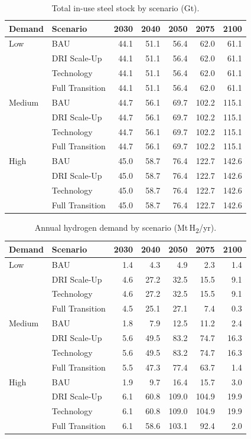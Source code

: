 \begin{table}[h!]
\centering
\small
\caption{Total in-use steel stock by scenario (Gt).}
\label{tab:app_steel_stock}
\begin{tabular}{llrrrrr}
\toprule
Demand & Scenario & 2030 & 2040 & 2050 & 2075 & 2100 \\
\midrule
Low & BAU & 44.1 & 51.1 & 56.4 & 62.0 & 61.1 \\
 & DRI Scale-Up & 44.1 & 51.1 & 56.4 & 62.0 & 61.1 \\
 & Technology & 44.1 & 51.1 & 56.4 & 62.0 & 61.1 \\
 & Full Transition & 44.1 & 51.1 & 56.4 & 62.0 & 61.1 \\
\midrule
Medium & BAU & 44.7 & 56.1 & 69.7 & 102.2 & 115.1 \\
 & DRI Scale-Up & 44.7 & 56.1 & 69.7 & 102.2 & 115.1 \\
 & Technology & 44.7 & 56.1 & 69.7 & 102.2 & 115.1 \\
 & Full Transition & 44.7 & 56.1 & 69.7 & 102.2 & 115.1 \\
\midrule
High & BAU & 45.0 & 58.7 & 76.4 & 122.7 & 142.6 \\
 & DRI Scale-Up & 45.0 & 58.7 & 76.4 & 122.7 & 142.6 \\
 & Technology & 45.0 & 58.7 & 76.4 & 122.7 & 142.6 \\
 & Full Transition & 45.0 & 58.7 & 76.4 & 122.7 & 142.6 \\
\bottomrule
\end{tabular}
\end{table}


\begin{table}[h!]
\centering
\small
\caption{Annual hydrogen demand by scenario (Mt\,H\textsubscript{2}/yr).}
\label{tab:app_h2_demand}
\begin{tabular}{llrrrrr}
\toprule
Demand & Scenario & 2030 & 2040 & 2050 & 2075 & 2100 \\
\midrule
Low & BAU & 1.4 & 4.3 & 4.9 & 2.3 & 1.4 \\
 & DRI Scale-Up & 4.6 & 27.2 & 32.5 & 15.5 & 9.1 \\
 & Technology & 4.6 & 27.2 & 32.5 & 15.5 & 9.1 \\
 & Full Transition & 4.5 & 25.1 & 27.1 & 7.4 & 0.3 \\
\midrule
Medium & BAU & 1.8 & 7.9 & 12.5 & 11.2 & 2.4 \\
 & DRI Scale-Up & 5.6 & 49.5 & 83.2 & 74.7 & 16.3 \\
 & Technology & 5.6 & 49.5 & 83.2 & 74.7 & 16.3 \\
 & Full Transition & 5.5 & 47.3 & 77.4 & 63.7 & 1.4 \\
\midrule
High & BAU & 1.9 & 9.7 & 16.4 & 15.7 & 3.0 \\
 & DRI Scale-Up & 6.1 & 60.8 & 109.0 & 104.9 & 19.9 \\
 & Technology & 6.1 & 60.8 & 109.0 & 104.9 & 19.9 \\
 & Full Transition & 6.1 & 58.6 & 103.1 & 92.4 & 2.0 \\
\bottomrule
\end{tabular}
\end{table}


